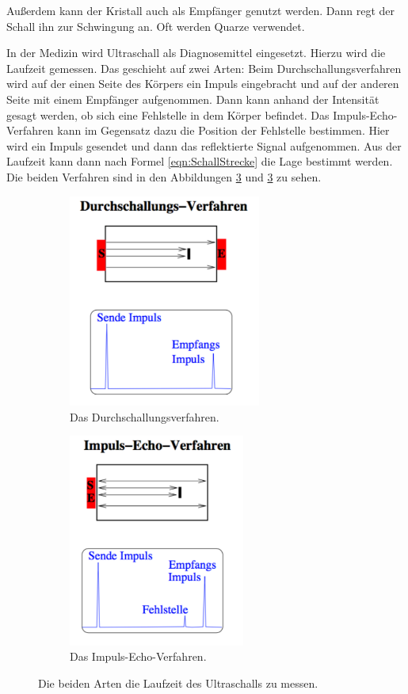 Außerdem kann der Kristall auch als Empfänger genutzt werden. Dann regt der Schall ihn zur Schwingung an.
Oft werden Quarze verwendet.

In der Medizin wird Ultraschall als Diagnosemittel eingesetzt. Hierzu wird die Laufzeit gemessen.
Das geschieht auf zwei Arten:
Beim Durchschallungsverfahren wird auf der einen Seite des Körpers ein Impuls eingebracht
und auf der anderen Seite mit einem Empfänger aufgenommen. Dann kann anhand der Intensität
gesagt werden, ob sich eine Fehlstelle in dem Körper befindet.
Das Impuls-Echo-Verfahren kann im Gegensatz dazu die Position der Fehlstelle bestimmen.
Hier wird ein Impuls gesendet und dann das reflektierte Signal aufgenommen. Aus
der Laufzeit kann dann nach Formel \eqref{eqn:SchallStrecke} die Lage bestimmt werden.
Die beiden Verfahren sind in den Abbildungen \ref{fig:verfahren}
und \ref{fig:verfahren} zu sehen.

\begin{figure}
  \centering
  \begin{subfigure}{0.48\textwidth}
    \centering
    \includegraphics[height=7cm]{Pics/durchschall.pdf}
    \caption{Das Durchschallungsverfahren.\cite{anleitung}}
    \label{fig:durchschall}
  \end{subfigure}
  \begin{subfigure}{0.48\textwidth}
    \centering
    \includegraphics[height=7cm]{Pics/Impuls-Echo.pdf}
    \caption{Das Impuls-Echo-Verfahren.\cite{anleitung}}
    \label{fig:impuls_echo}
  \end{subfigure}
  \caption{Die beiden Arten die Laufzeit des Ultraschalls zu messen.}
  \label{fig:verfahren}
\end{figure}

